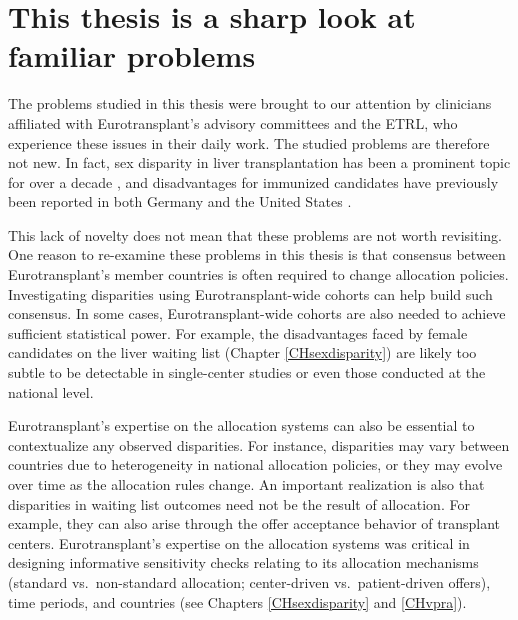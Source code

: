 \documentclass[11pt,twoside,]{book}
\begin{document}
\section{This thesis is a sharp look at familiar problems}\label{this-thesis-is-a-sharp-look-at-familiar-problems}

The problems studied in this thesis were brought to our attention by clinicians
affiliated with Eurotransplant's advisory committees and the ETRL, who experience these issues in
their daily work. The studied problems are therefore not new. In fact,
sex disparity in liver transplantation has been a prominent topic for over a decade
\citep{moylanDisparitiesLiverTransplantation2008, mathurSexBasedDisparitiesLiver2011, laiHeightContributesGender2010}, and disadvantages for immunized candidates
have previously been reported in both Germany \citep{ziemannUnacceptableHumanLeucocyte2017, zecherImpactSensitizationWaiting2022a} and the United States \citep{stewartSmoothingItOut2012}.

This lack of novelty does not mean that these problems are not worth revisiting.
One reason to re-examine these problems in this thesis is that consensus between
Eurotransplant's member countries is often required to change allocation policies.
Investigating disparities using Eurotransplant-wide cohorts can help build such consensus.
In some cases, Eurotransplant-wide cohorts are also needed to achieve sufficient
statistical power. For example, the disadvantages faced by female candidates
on the liver waiting list (Chapter \ref{CHsexdisparity}) are likely too
subtle to be detectable in single-center studies or even those conducted at the
national level.

Eurotransplant's expertise on the allocation systems can also be essential to
contextualize any observed disparities. For instance, disparities
may vary between countries due to heterogeneity in national
allocation policies, or they may evolve over time as the allocation rules
change. An important realization is also that disparities in waiting list outcomes
need not be the result of allocation. For example, they can also arise through
the offer acceptance behavior of transplant centers. Eurotransplant's expertise
on the allocation systems was critical in designing informative sensitivity
checks relating to its allocation mechanisms
(standard vs.~non-standard allocation; center-driven vs.~patient-driven offers),
time periods, and countries (see Chapters \ref{CHsexdisparity} and \ref{CHvpra}).
\end{document}
